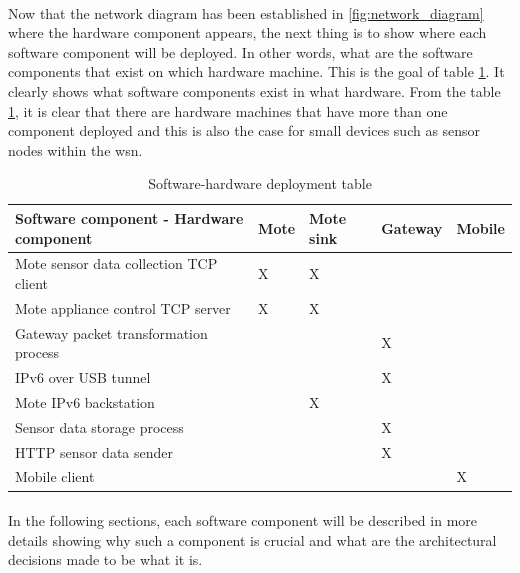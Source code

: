 \documentclass[oneside,12pt,a4paper,final]{book}
\begin{document}
\paragraph{}
Now that the network diagram has been established in \ref{fig:network_diagram} where the hardware component appears, the next thing is to show where each software component will be deployed. In other words, what are the software components that exist on which hardware machine. This is the goal of table \ref{table:soft_hard_deployment}. It clearly shows what software components exist in what hardware. From the table \ref{table:soft_hard_deployment}, it is clear that there are hardware machines that have more than one component deployed and this is also the case for small devices such as sensor nodes within the \gls{wsn}.

\begin{table}
    \begin{tabular}{lllll}
    		  \hline
    Software component - Hardware component & Mote & Mote sink & Gateway & Mobile \\ \hline
    Mote sensor data collection TCP client  & X    & X         & ~       & ~      \\ 
    Mote appliance control TCP server       & X    & X         & ~       & ~      \\
    Gateway packet transformation process   & ~    & ~         & X       & ~      \\
    IPv6 over USB tunnel                    & ~    & ~         & X       & ~      \\
    Mote IPv6 backstation                   & ~    & X         & ~       & ~      \\
    Sensor data storage process             & ~    & ~         & X       & ~      \\
    HTTP sensor data sender                 & ~    & ~         & X       & ~      \\
    Mobile client                           & ~    & ~         & ~       & X      \\
    \end{tabular}
    \caption{Software-hardware deployment table}
    \label{table:soft_hard_deployment}
\end{table}
\paragraph{}
In the following sections, each software component will be described in more details showing why such a component is crucial and what are the architectural decisions made to be what it is.
\end{document}
